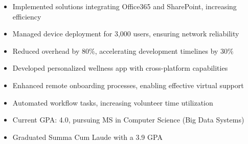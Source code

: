 \makecvheader

\par\bigskip
{}
\par\smallskip
\begin{minipage}{13.75cm}
  \begin{itemize}
    \item Implemented solutions integrating Office365 and SharePoint, increasing efficiency
    \item Managed device deployment for 3,000 users, ensuring network reliability
  \end{itemize}
\end{minipage}
\par\smallskip
\divider

\par\smallskip
\begin{minipage}{13.75cm}
  \begin{itemize}
    \item Reduced overhead by 80\%, accelerating development timelines by 30\%
    \item Developed personalized wellness app with cross-platform capabilities
  \end{itemize}
\end{minipage}
\par\smallskip
\divider

\par\smallskip
\begin{minipage}{13.75cm}
  \begin{itemize}
    \item Enhanced remote onboarding processes, enabling effective virtual support
    \item Automated workflow tasks, increasing volunteer time utilization
  \end{itemize}
\end{minipage}

\par\bigskip
{}
\begin{itemize}
  \item Current GPA: 4.0, pursuing MS in Computer Science (Big Data Systems)
\end{itemize}
\divider

\begin{itemize}
  \item Graduated Summa Cum Laude with a 3.9 GPA
\end{itemize}


